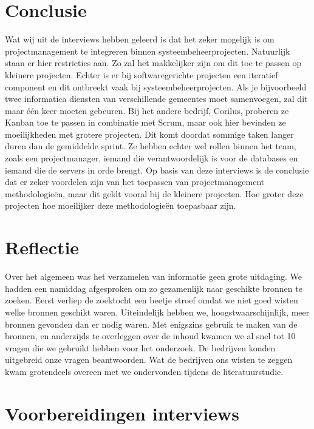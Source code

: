 \documentclass{article}
\begin{document}
    
    \section{Conclusie}
    
    Wat wij uit de interviews hebben geleerd is dat het zeker mogelijk is om projectmanagement te integreren binnen systeembeheerprojecten.
    Natuurlijk staan er hier restricties aan. Zo zal het makkelijker zijn om dit toe te passen op kleinere projecten. 
    Echter is er bij softwaregerichte projecten een iteratief component en dit ontbreekt vaak bij systeembeheerprojecten. 
    Als je bijvoorbeeld twee informatica diensten van verschillende gemeentes moet samenvoegen, zal dit maar één keer moeten gebeuren.
    Bij het andere bedrijf, Corilus, proberen ze Kanban toe te passen in combinatie met Scrum, maar ook hier bevinden ze moeilijkheden met grotere projecten.
    Dit komt doordat sommige taken langer duren dan de gemiddelde sprint.
    Ze hebben echter wel rollen binnen het team, zoals een projectmanager, iemand die verantwoordelijk is voor de databases en iemand die de servers in orde brengt.
    Op basis van deze interviews is de conclusie dat er zeker voordelen zijn van het toepassen van projectmanagement methodologieën,
    maar dit geldt vooral bij de kleinere projecten. Hoe groter deze projecten hoe moeilijker deze methodologieën toepasbaar zijn.

    \newpage
    \printbibliography
    \section{Reflectie}
    Over het algemeen was het verzamelen van informatie geen grote uitdaging. We hadden een namiddag afgesproken om zo 
    gezamenlijk naar geschikte bronnen te zoeken. Eerst verliep de zoektocht een beetje stroef omdat we niet goed wisten welke bronnen 
    geschikt waren. Uiteindelijk hebben we, hoogstwaarschijnlijk, meer bronnen gevonden dan er nodig waren. Met 
    enigszins gebruik te maken van de bronnen, en anderzijds te overleggen over de inhoud kwamen we al snel tot 10 vragen die we gebruikt hebben voor het onderzoek. 
    De bedrijven konden uitgebreid onze vragen beantwoorden. Wat de bedrijven ons wisten te zeggen kwam grotendeels overeen 
    met we ondervonden tijdens de literatuurstudie.  
    \section{Voorbereidingen interviews}
\end{document}
